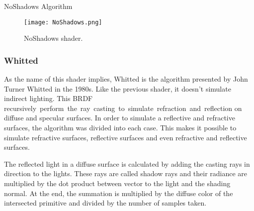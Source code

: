 \begin{algorithm}
	\label{NoShadowsAlgorithm}
	\caption{NoShadows Algorithm}
	
\end{algorithm}

\begin{figure}[H]
	\centering
	\caption{NoShadows shader.}
	\label{NoShadows shader.}
	\texttt{[image: NoShadows.png]}
\end{figure}

\subsubsection{Whitted}

\par
As the name of this shader implies, Whitted is the algorithm presented by John Turner Whitted in the 1980s.
Like the previous shader, it doesn't simulate indirect lighting.
This BRDF recursively perform the ray casting to simulate refraction and reflection on diffuse and specular surfaces.
In order to simulate a reflective and refractive surfaces, the algorithm was divided into each case.
This makes it possible to simulate refractive surfaces, reflective surfaces and even refractive and reflective surfaces.

\par
The reflected light in a diffuse surface is calculated by adding the casting rays in direction to the lights.
These rays are called shadow rays and their radiance are multiplied by the dot product between vector to the light and the shading normal.
At the end, the summation is multiplied by the diffuse color of the intersected primitive and divided by the number of samples taken.

